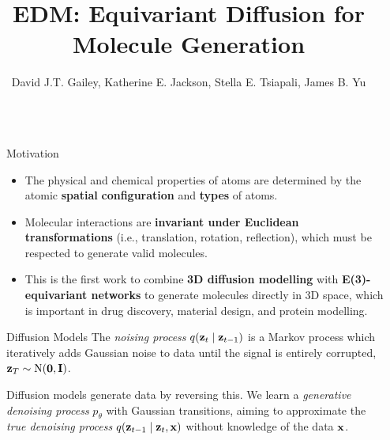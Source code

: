 \documentclass[final]{beamer}
\title{EDM: Equivariant Diffusion for Molecule Generation}
\author{David J.T. Gailey, Katherine E. Jackson, Stella E. Tsiapali, James B. Yu}
\newlength{\sepwidth}
\newlength{\colwidth}
\newcommand{\separatorcolumn}{
  \begin{column}{\sepwidth}
\end{column}}
\begin{document}
{
}

\begin{frame}[t]
  \begin{columns}[t]
    \separatorcolumn

    \begin{column}{\colwidth}

      \begin{block}{Motivation}


        \begin{itemize}
          \item The physical and chemical properties of atoms are determined by the atomic \textbf{spatial} \textbf{configuration} and \textbf{types} of atoms.
          \item Molecular interactions are \textbf{invariant under Euclidean transformations} (i.e., translation, rotation, reflection), which must be respected to generate valid molecules.
          \item This is the first work to combine \textbf{3D diffusion modelling} with \textbf{E(3)-equivariant networks} to generate molecules directly in 3D space, which is important in drug discovery, material design, and protein modelling.
        \end{itemize}

      \end{block}

      \begin{block}{Diffusion Models}
        The \textit{noising process} \(q(\vb{z}_{t} \mid \vb{z}_{t-1})\) is a Markov process which iteratively adds Gaussian noise to data until the signal is entirely corrupted, \(\vb{z}_{T} \sim \operatorname{N}(\vb{0}, \mathbf{I})\).

        Diffusion models generate data by reversing this. We learn a \textit{generative denoising process} \(p_{\theta}\) with Gaussian transitions, aiming to approximate the \textit{true denoising process} \(q(\vb{z}_{t-1} \mid \vb{z}_{t}, \vb{x})\) without knowledge of the data \(\vb{x}\).


\end{block}
\end{column}
\end{columns}
\end{frame}
\end{document}

